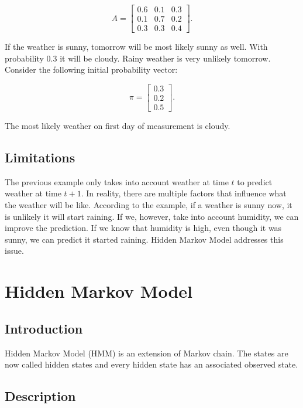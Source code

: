 \documentclass[thesis=B,english]{FITthesis}[2012/06/26]
\begin{document}
\begin{equation}
A =
\begin{bmatrix}
	0.6	& 0.1 & 0.3 \\
	0.1 & 0.7 & 0.2 \\
	0.3 & 0.3 & 0.4
\end{bmatrix}.
\end{equation}

If the weather is sunny, tomorrow will be most likely sunny as well. With probability 0.3 it will be cloudy. Rainy weather is very unlikely tomorrow. Consider the following initial probability vector:

\begin{equation}
\pi = \begin{bmatrix} 0.3 \\ 0.2 \\ 0.5 \end{bmatrix}.
\end{equation}

The most likely weather on first day of measurement is cloudy.

\subsection{Limitations}

The previous example only takes into account weather at time $t$ to predict weather at time $t+1$. In reality, there are multiple factors that influence what the weather will be like. According to the example, if a weather is sunny now, it is unlikely it will start raining. If we, however, take into account humidity, we can improve the prediction. If we know that humidity is high, even though it was sunny, we can predict it started raining. Hidden Markov Model addresses this issue.

\section{Hidden Markov Model}

\subsection{Introduction}

Hidden Markov Model (HMM) is an extension of Markov chain. The states are now called hidden states and every hidden state has an associated observed state.

\subsection{Description}
\end{document}
